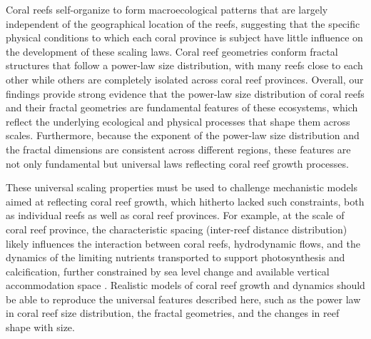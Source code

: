 Coral reefs self-organize to form macroecological patterns that are largely
independent of the geographical location of the reefs, suggesting that the
specific physical conditions to which each coral province is subject have
little influence on the development of these scaling laws. Coral reef
geometries conform fractal structures that follow a power-law size
distribution, with many reefs close to each other while others are completely
isolated across coral reef provinces. Overall, our findings provide strong
evidence that the power-law size distribution of coral reefs and their fractal
geometries are fundamental features of these ecosystems, which reflect the
underlying ecological and physical processes that shape them across scales.
Furthermore, because the exponent of the power-law size distribution and the
fractal dimensions are consistent across different regions, these features are
not only fundamental but universal laws reflecting coral reef growth
processes.

These universal scaling properties must be used to challenge mechanistic
models aimed at reflecting coral reef growth, which hitherto lacked such
constraints, both as individual reefs as well as coral reef provinces. For
example, at the scale of coral reef province, the characteristic spacing
(inter-reef distance distribution) likely influences the interaction between
coral reefs, hydrodynamic flows, and the dynamics of the limiting nutrients
transported to support photosynthesis and calcification, further constrained by
sea level change and available vertical accommodation space \cite{Nakamura2007,
    Mistr2003, Bosscher1992}. Realistic models of coral reef growth and
dynamics should be able to reproduce the universal features described here,
such as the power law in coral reef size distribution, the fractal geometries,
and the changes in reef shape with size.

